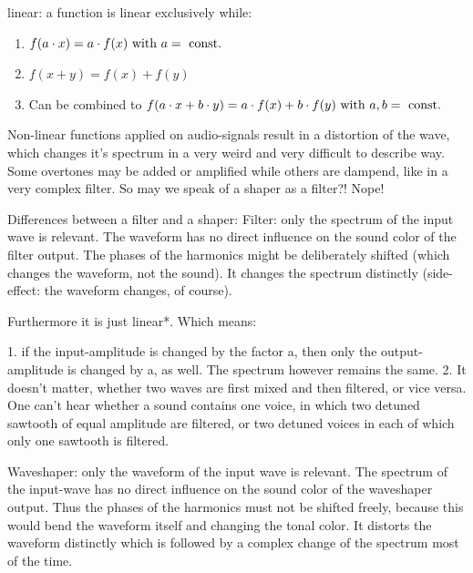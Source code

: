 linear: a function is linear exclusively while: 
\begin{enumerate}
	\item $f(a\cdot x) = a \cdot f(x) \text{ with } a=\text{ const. }$
	\item $f(x+y) = f(x)+f(y)$
	\item Can be combined to $f(a\cdot x+b \cdot y)=a \cdot f(x)+b \cdot f(y) \text{ with } a,b=\text{ const. }$
\end{enumerate}
Non-linear functions applied on audio-signals result in a distortion of the wave, which changes it's spectrum in a very weird and very difficult to describe way. Some overtones may be added or amplified while others are dampend, like in a very complex filter. So may we speak of a shaper as a filter?! Nope!

Differences between a filter and a shaper:
Filter: only the spectrum of the input wave is relevant. The waveform has no direct influence on the sound color of the filter output. The phases of the harmonics might be deliberately shifted (which changes the waveform, not the sound). It changes the spectrum distinctly (side-effect: the waveform changes, of course).

Furthermore it is just linear*. Which means:

1. if the input-amplitude is changed by the factor a, then only the output-amplitude is changed by a, as well. The spectrum however remains the same.
2. It doesn't matter, whether two waves are first mixed and then filtered, or vice versa. One can't hear whether a sound contains one voice, in which two detuned sawtooth of equal amplitude are filtered, or two detuned voices in each of which only one sawtooth is filtered.

Waveshaper: only the waveform of the input wave is relevant. The spectrum of the input-wave has no direct influence on the sound color of the waveshaper output. Thus the phases of the harmonics must not be shifted freely, because this would bend the waveform itself and changing the tonal color. It distorts the waveform distinctly which is followed by a complex change of the spectrum most of the time.

